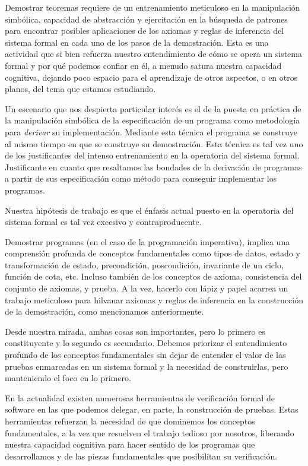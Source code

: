\documentclass[12pt, a4paper, openany, fleqn]{book}
\begin{document}
    Demostrar teoremas requiere de un entrenamiento meticuloso en la manipulación simbólica, capacidad de abstracción y ejercitación en la búsqueda de patrones para encontrar posibles aplicaciones de los axiomas y reglas de inferencia del sistema formal en cada uno de los pasos de la demostración.
    Esta es una actividad que si bien refuerza nuestro entendimiento de cómo se opera un sistema formal y por qué podemos confiar en él, a menudo satura nuestra capacidad cognitiva, dejando poco espacio para el aprendizaje de otros aspectos, o en otros planos, del tema que estamos estudiando.

    Un escenario que nos despierta particular interés es el de la puesta en práctica de la manipulación simbólica de la especificación de un programa como metodología para \textit{derivar} su implementación. Mediante esta técnica el programa se construye al mismo tiempo en que se construye su demostración.
    Esta técnica es tal vez uno de los justificantes del intenso entrenamiento en la operatoria del sistema formal. Justificante en cuanto que resaltamos las bondades de la derivación de programas a partir de sus especificación como método para conseguir implementar los programas.

    Nuestra hipótesis de trabajo es que el énfasis actual puesto en la operatoria del sistema formal es tal vez excesivo y contraproducente.

    Demostrar programas (en el caso de la programación imperativa), implica una comprensión profunda de conceptos fundamentales como tipos de datos, estado y transformación de estado, precondición, poscondición, invariante de un ciclo, función de cota, etc. Incluso también de los conceptos de axioma, consistencia del conjunto de axiomas, y prueba.
    A la vez, hacerlo con lápiz y papel acarrea un trabajo meticuloso para hilvanar axiomas y reglas de inferencia en la construcción de la demostración, como mencionamos anteriormente.

    Desde nuestra mirada, ambas cosas son importantes, pero lo primero es constituyente y lo segundo es secundario. Debemos priorizar el entendimiento profundo de los conceptos fundamentales sin dejar de entender el valor de las pruebas enmarcadas en un sistema formal y la necesidad de construirlas, pero manteniendo el foco en lo primero.

    En la actualidad existen numerosas herramientas de verificación formal de software en las que podemos delegar, en parte, la construcción de pruebas. Estas herramientas refuerzan la necesidad de que dominemos los conceptos fundamentales, a la vez que resuelven el trabajo tedioso por nosotros, liberando nuestra capacidad cognitiva para hacer sentido de los programas que desarrollamos y de las piezas fundamentales que posibilitan su verificación.
\end{document}
